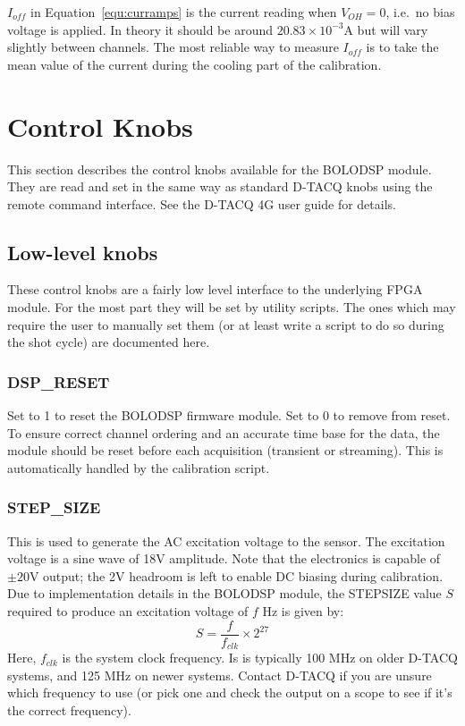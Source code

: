 \documentclass[12pt,a4paper]{article}
\begin{document}
$I_{off}$ in Equation~\ref{equ:curramps} is the current reading when $V_{OH} = 0$, i.e.\ no bias voltage is applied. In theory it should be around
$20.83 \times 10^{-3} \mathrm{A}$ but will vary slightly between channels. The most reliable way to measure $I_{off}$ is to take the mean value of
the current during the cooling part of the calibration.

\section{Control Knobs}
\label{sec:knobs}
This section describes the control knobs available for the BOLODSP module. They are read and set in the same way as standard D-TACQ knobs using the remote
command interface. See the D-TACQ 4G user guide for details.

\subsection{Low-level knobs}
\label{sec:knobsll}
These control knobs are a fairly low level interface to the underlying FPGA module. For the most part they will be set by utility scripts. The ones which
may require the user to manually set them (or at least write a script to do so during the shot cycle) are documented here.

\subsubsection{DSP{\_}RESET}
Set to 1 to reset the BOLODSP firmware module. Set to 0 to remove from reset. To ensure correct channel ordering and an accurate time base for the data,
the module should be reset before each acquisition (transient or streaming). This is automatically handled by the calibration script.

\subsubsection{STEP{\_}SIZE}
This is used to generate the AC excitation voltage to the sensor. The excitation voltage is a sine wave of 18V amplitude. Note that the electronics is
capable of $\pm 20\mathrm{V}$ output; the 2V headroom is left to enable DC biasing during calibration. Due to implementation details in the BOLODSP
module, the STEP{\textunderscore}SIZE value $S$ required to produce an excitation voltage of $f$ Hz is given by:
\begin{equation}
  \label{equ:step_size}
  S = \frac{f}{f_{clk}} \times 2^{27}
\end{equation}
Here, $f_{clk}$ is the system clock frequency. Is is typically 100 MHz on older D-TACQ systems, and 125 MHz on newer systems. Contact D-TACQ if you are
unsure which frequency to use (or pick one and check the output on a scope to see if it's the correct frequency).
\end{document}
